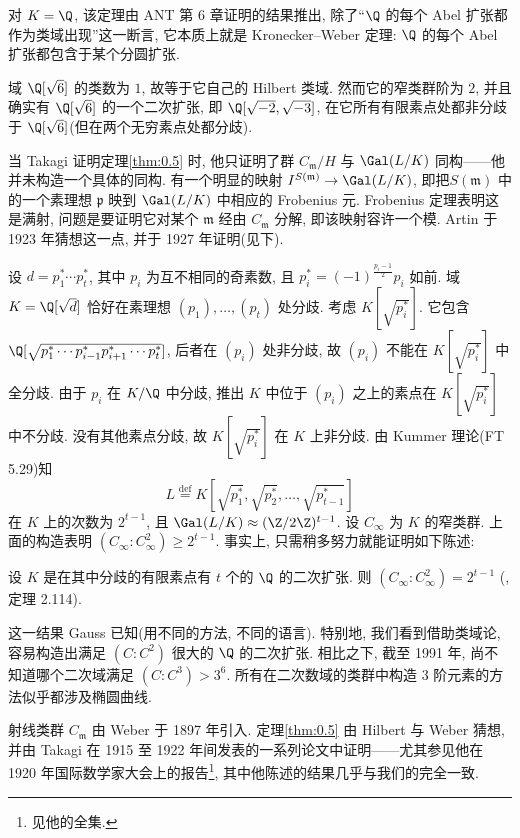 对 $K = \Q$, 该定理由 ANT 第 6 章证明的结果推出, 除了``$\Q$ 的每个 Abel 扩张都作为类域出现''这一断言, 它本质上就是 Kronecker--Weber 定理: $\Q$ 的每个 Abel 扩张都包含于某个分圆扩张.

\begin{example}\label{ex:0.6}
域 $\Q[\sqrt{6}]$ 的类数为 $1$, 故等于它自己的 Hilbert 类域. 然而它的窄类群阶为 $2$, 并且确实有 $\Q[\sqrt{6}]$ 的一个二次扩张, 即 $\Q[\sqrt{-2}, \sqrt{-3}]$, 在它所有有限素点处都非分歧于 $\Q[\sqrt{6}]$(但在两个无穷素点处都分歧).
\end{example}

当 Takagi 证明定理\ref{thm:0.5} 时, 他只证明了群 $C_{\mathfrak{m}}/H$ 与 $\Gal(L/K)$ 同构——他并未构造一个具体的同构. 有一个明显的映射 $I^{S(\mathfrak{m})} \to \Gal(L/K)$, 即把$S(\mathfrak{m})$ 中的一个素理想 $\mathfrak{p}$ 映到 $\Gal(L/K)$ 中相应的 Frobenius 元. Frobenius 定理表明这是满射, 问题是要证明它对某个 $\mathfrak{m}$ 经由 $C_{\mathfrak{m}}$ 分解, 即该映射容许一个模. Artin 于 1923 年猜想这一点, 并于 1927 年证明(见下).

\begin{example}\label{ex:0.7}
设 $d = p_{1}^{*} \cdots p_{t}^{*}$, 其中 $p_{i}$ 为互不相同的奇素数, 且 $p_{i}^{*} = (-1)^{\frac{p_{i}-1}{2}}p_{i}$ 如前. 域 $K = \Q[\sqrt{d}]$ 恰好在素理想 $(p_{1}), \ldots, (p_{t})$ 处分歧. 考虑 $K[\sqrt{p_{i}^{*}}]$. 它包含 $\Q[\sqrt{p_{1}^{*} \cdots p_{i-1}^{*} p_{i+1}^{*} \cdots p_{t}^{*}}]$, 后者在 $(p_{i})$ 处非分歧, 故 $(p_{i})$ 不能在 $K[\sqrt{p_{i}^{*}}]$ 中全分歧. 由于 $p_{i}$ 在 $K/\Q$ 中分歧, 推出 $K$ 中位于 $(p_{i})$ 之上的素点在 $K[\sqrt{p_{i}^{*}}]$ 中不分歧. 没有其他素点分歧, 故 $K[\sqrt{p_{i}^{*}}]$ 在 $K$ 上非分歧. 由 Kummer 理论(FT 5.29)知
\[
L \overset{\mathrm{def}}{=} K[\sqrt{p_{1}^{*}}, \sqrt{p_{2}^{*}}, \ldots, \sqrt{p_{t-1}^{*}}]
\]
在 $K$ 上的次数为 $2^{t-1}$, 且 $\Gal(L/K) \approx (\Z/2\Z)^{t-1}$. 设 $C_{\infty}$ 为 $K$ 的窄类群. 上面的构造表明 $(C_{\infty} : C_{\infty}^{2}) \geq 2^{t-1}$. 事实上, 只需稍多努力就能证明如下陈述:

设 $K$ 是在其中分歧的有限素点有 $t$ 个的 $\Q$ 的二次扩张. 则 $(C_{\infty} : C_{\infty}^{2}) = 2^{t-1}$ (\cite{Koch1992}, 定理 2.114).

这一结果 Gauss 已知(用不同的方法, 不同的语言). 特别地, 我们看到借助类域论, 容易构造出满足 $(C : C^{2})$ 很大的 $\Q$ 的二次扩张. 相比之下, 截至 1991 年, 尚不知道哪个二次域满足 $(C : C^{3}) > 3^{6}$. 所有在二次数域的类群中构造 $3$ 阶元素的方法似乎都涉及椭圆曲线.
\end{example}

\begin{NOTES}
射线类群 $C_{\mathfrak{m}}$ 由 Weber 于 1897 年引入. 定理\ref{thm:0.5} 由 Hilbert 与 Weber 猜想, 并由 Takagi 在 1915 至 1922 年间发表的一系列论文中证明——尤其参见他在 1920 年国际数学家大会上的报告\footnote{见他的全集. }, 其中他陈述的结果几乎与我们的完全一致.
\end{NOTES}

